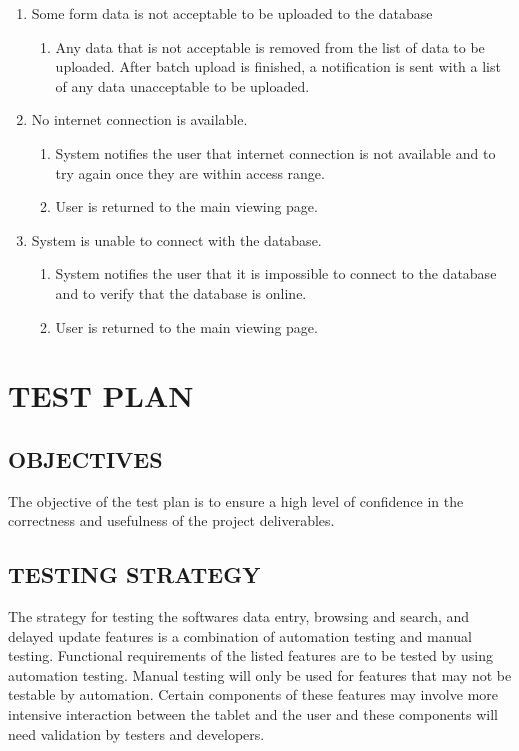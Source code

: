 \documentclass[twoside,letterpaper]{article}
\begin{document}
\begin{enumerate}
\item Some form data is not acceptable to be uploaded to the database
\begin{enumerate}
\item Any data that is not acceptable is removed from the list of data to be uploaded. After batch upload is finished, a notification is sent with a list of any data unacceptable to be uploaded.
\end{enumerate}

\item No internet connection is available.
\begin{enumerate}
\item System notifies the user that internet connection is not available and to try again once they are within access range.
\item User is returned to the main viewing page.
\end{enumerate}

\item System is unable to connect with the database.
\begin{enumerate}
\item System notifies the user that it is impossible to connect to the database and to verify that the database is online.
\item User is returned to the main viewing page.
\end{enumerate}
\end{enumerate}


\clearpage\section[TEST PLAN]{\rmfamily\bfseries\color{black}
TEST PLAN}

\subsection{OBJECTIVES}
{\rmfamily\color{black}
 The objective of the test plan is to ensure a high level of confidence in the correctness and usefulness of the project deliverables.}

\subsection{TESTING STRATEGY}
{\rmfamily\color{black}
        The strategy for testing the softwares data entry, browsing and search, and delayed update features is a combination of automation testing and manual testing. Functional requirements of the listed features are to be tested by using automation testing. Manual testing will only be used for features that may not be testable by automation. Certain components of these features may involve more intensive interaction between the tablet and the user and these components will need validation by testers and developers.}
        
\end{document}
